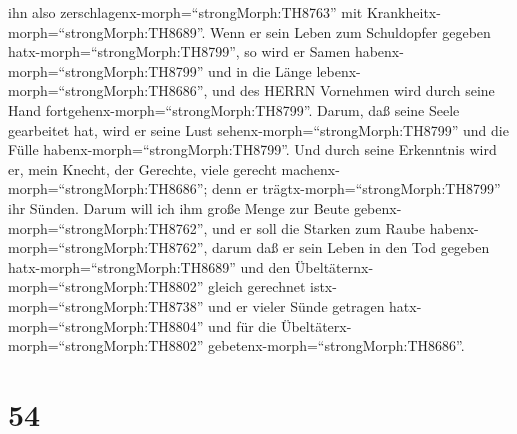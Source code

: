 ihn also zerschlagenx-morph=``strongMorph:TH8763'' mit
Krankheitx-morph=``strongMorph:TH8689''. Wenn er sein Leben zum
Schuldopfer gegeben hatx-morph=``strongMorph:TH8799'', so wird er Samen
habenx-morph=``strongMorph:TH8799'' und in die Länge
lebenx-morph=``strongMorph:TH8686'', und des HERRN Vornehmen wird durch
seine Hand fortgehenx-morph=``strongMorph:TH8799''.  Darum,
daß seine Seele gearbeitet hat, wird er seine Lust
sehenx-morph=``strongMorph:TH8799'' und die Fülle
habenx-morph=``strongMorph:TH8799''. Und durch seine Erkenntnis wird er,
mein Knecht, der Gerechte, viele gerecht
machenx-morph=``strongMorph:TH8686''; denn er
trägtx-morph=``strongMorph:TH8799'' ihr Sünden.  Darum will
ich ihm große Menge zur Beute gebenx-morph=``strongMorph:TH8762'', und
er soll die Starken zum Raube habenx-morph=``strongMorph:TH8762'', darum
daß er sein Leben in den Tod gegeben hatx-morph=``strongMorph:TH8689''
und den Übeltäternx-morph=``strongMorph:TH8802'' gleich gerechnet
istx-morph=``strongMorph:TH8738'' und er vieler Sünde getragen
hatx-morph=``strongMorph:TH8804'' und für die
Übeltäterx-morph=``strongMorph:TH8802''
gebetenx-morph=``strongMorph:TH8686''.

\hypertarget{section-53}{%
\section{54}\label{section-53}}

